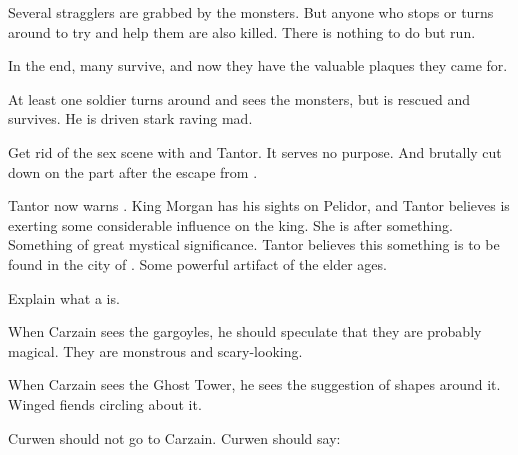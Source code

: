 \begin{changes}
    Several stragglers are grabbed by the monsters.
    But anyone who stops or turns around to try and help them are also killed. 
    There is nothing to do but run. 
    
    In the end, many survive, and now they have the valuable plaques they came for. 
    
    At least one soldier turns around and sees the monsters, but is rescued and survives. 
    He is driven stark raving mad. 
    
    Get rid of the sex scene with \Takestsha and Tantor. 
    It serves no purpose. 
    And brutally cut down on the part after the escape from \EreshKal. 
    
    Tantor now warns \Onatol. 
    King Morgan has his sights on Pelidor, and Tantor believes \Takestsha is exerting some considerable influence on the king. 
    She is after something.
    Something of great mystical significance.
    Tantor believes this something is to be found in the city of \Forclin.
    Some powerful artifact of the elder ages.
  
  \begin{comment}
    \paragraph{\Forclin}
  \end{comment}
  \changesitem{\Forclin}
    Explain what a \bacconate is.
    
    When Carzain sees the gargoyles, he should speculate that they are probably magical.
    They are monstrous and scary-looking.
    
    When Carzain sees the Ghost Tower, he sees the suggestion of shapes around it.
    Winged fiends circling about it. 
    
    Curwen should not go to Carzain.
    Curwen should say: 
\end{changes}









